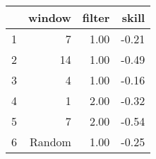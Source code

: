 \begin{table}[ht]
\centering
\begin{tabular}{rrrr}
  \hline
 & window & filter & skill \\ 
  \hline
1 & 7 & 1.00 & -0.21 \\ 
  2 & 14 & 1.00 & -0.49 \\ 
  3 & 4 & 1.00 & -0.16 \\ 
  4 & 1 & 2.00 & -0.32 \\ 
  5 & 7 & 2.00 & -0.54 \\ 
  6 & Random & 1.00 & -0.25 \\ 
   \hline
\end{tabular}
\end{table}
